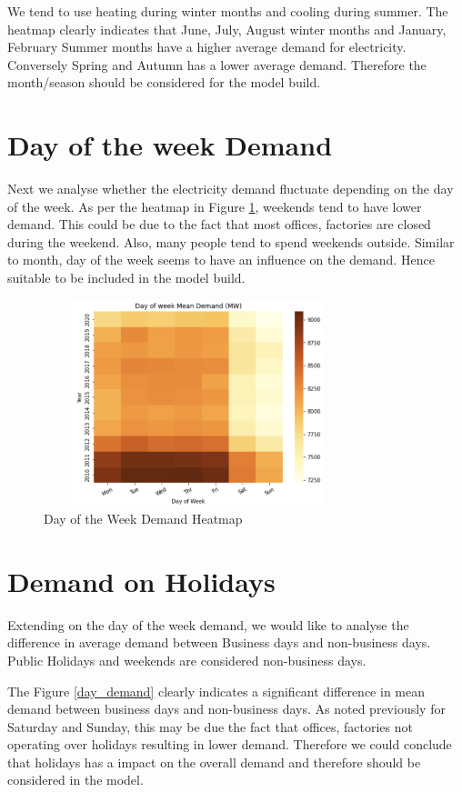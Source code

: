 \documentclass[mstat,12pt]{unswthesis}
\begin{document}
We tend to use heating during winter months and cooling during summer.
The heatmap clearly indicates that June, July, August winter months and
January, February Summer months have a higher average demand for
electricity. Conversely Spring and Autumn has a lower average demand.
Therefore the month/season should be considered for the model build.

\section{Day of the week Demand}\label{day-of-the-week-demand}

Next we analyse whether the electricity demand fluctuate depending on
the day of the week. As per the heatmap in Figure \ref{day_heat},
weekends tend to have lower demand. This could be due to the fact that
most offices, factories are closed during the weekend. Also, many people
tend to spend weekends outside. Similar to month, day of the week seems
to have an influence on the demand. Hence suitable to be included in the
model build.

\begin{figure}[H]
\centering
\includegraphics[width=0.80\textwidth,height=6cm]{day_heat.png}
\caption{Day of the Week Demand Heatmap}
\label{day_heat}
\end{figure}

\section{Demand on Holidays}\label{demand-on-holidays}

Extending on the day of the week demand, we would like to analyse the
difference in average demand between Business days and non-business
days. Public Holidays and weekends are considered non-business days.

The Figure \ref{day_demand} clearly indicates a significant difference
in mean demand between business days and non-business days. As noted
previously for Saturday and Sunday, this may be due the fact that
offices, factories not operating over holidays resulting in lower
demand. Therefore we could conclude that holidays has a impact on the
overall demand and therefore should be considered in the model.
\end{document}
